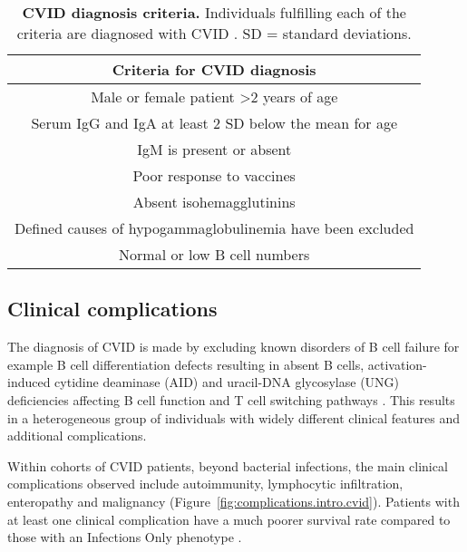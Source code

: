 \begin{table}[H]
\centering
\singlespacing
\caption[CVID diagnosis criteria]{\textbf{CVID diagnosis criteria.} Individuals fulfilling each of the criteria are diagnosed with CVID \parencite{Conley1999}. SD = standard deviations.}  
\label{tab:criteria.cvid}
\begin{tabular}{c}
\toprule
\textbf{Criteria for CVID diagnosis} \\ 
\midrule
Male or female patient \textgreater 2 years of age\\
Serum IgG and IgA at least 2 SD below the mean for age \\
IgM is present or absent\\
Poor response to vaccines \\
Absent isohemagglutinins \\
Defined causes of hypogammaglobulinemia have been excluded \\
Normal or low B cell numbers \\
\bottomrule
\end{tabular}
\end{table} 

\subsection{Clinical complications}
The diagnosis of CVID is made by excluding known disorders of B cell failure for example B cell differentiation defects resulting in absent B cells, activation-induced cytidine deaminase (AID) and uracil-DNA glycosylase (UNG) deficiencies affecting B cell function and T cell switching pathways \parencite{Chapel2008}. This results in a heterogeneous group of individuals with widely different clinical features and additional complications.

Within cohorts of CVID patients, beyond bacterial infections, the main clinical complications observed include autoimmunity, lymphocytic infiltration, enteropathy and malignancy (Figure~\ref{fig:complications.intro.cvid}). Patients with at least one clinical complication have a much poorer survival rate compared to those with an Infections Only phenotype \parencite{Chapel2008}.


